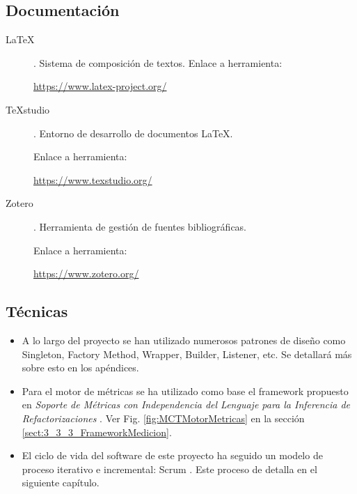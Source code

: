 \subsection{Documentación}
\begin{description}
	\item[LaTeX]. Sistema de composición de textos.
		Enlace a herramienta:
		
		\url{https://www.latex-project.org/}
		
	\item[TeXstudio]. Entorno de desarrollo de documentos LaTeX.
	
		Enlace a herramienta:
		
		\url{https://www.texstudio.org/}
	
	\item[Zotero]. Herramienta de gestión de fuentes bibliográficas.
		
		Enlace a herramienta:
		
		\url{https://www.zotero.org/}
	
\end{description}
\subsection{Técnicas}
\begin{itemize}
	\item A lo largo del proyecto se han utilizado numerosos patrones de diseño \cite{gamma_patrones_2002} como Singleton, Factory Method, Wrapper, Builder, Listener, etc. Se detallará más sobre esto en los apéndices.
	
	\item Para el motor de métricas se ha utilizado como base el framework propuesto en \textit{Soporte de Métricas con Independencia del Lenguaje para la Inferencia de Refactorizaciones} \cite{marticorena_soporte_2005}. Ver Fig. \ref{fig:MCTMotorMetricas} en la sección \ref{sect:3_3_3_FrameworkMedicion}.
	
	\item El ciclo de vida del software de este proyecto ha seguido un modelo de proceso iterativo e incremental: Scrum \cite{noauthor_scrum_2019}. Este proceso de detalla en el siguiente capítulo.
\end{itemize}

